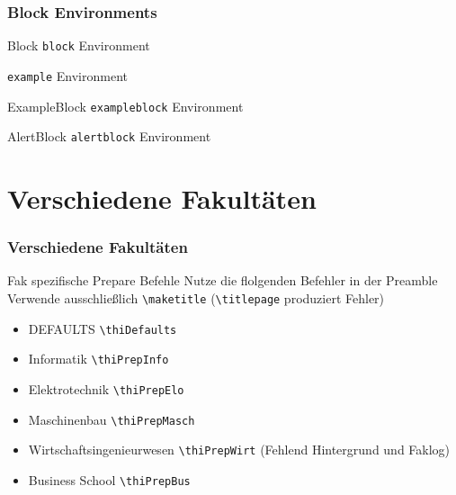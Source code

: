 \documentclass[aspectratio=169]{beamer}
\begin{document}
\begin{frame}
    \frametitle{Block Environments}
    \begin{block}{Block}
        \texttt{block} Environment
    \end{block}
    \begin{example}
        \texttt{example} Environment
    \end{example}
    \begin{exampleblock}{ExampleBlock}
        \texttt{exampleblock} Environment
    \end{exampleblock}
    \begin{alertblock}{AlertBlock}
        \texttt{alertblock} Environment
    \end{alertblock}
\end{frame}

\section{Verschiedene Fakultäten}
\begin{frame}
    \frametitle{Verschiedene Fakultäten}
    \begin{alertblock}{Fak spezifische Prepare Befehle}
        Nutze die flolgenden Befehler in der Preamble\\
        Verwende ausschließlich \texttt{\textbackslash maketitle} (\texttt{\textbackslash titlepage} produziert Fehler)
    \end{alertblock}
    \begin{itemize}
        \item \textcolor{thiblue}{DEFAULTS} \texttt \texttt{\textbackslash thiDefaults}
        \item \textcolor{\thifakinfocolor}{Informatik} \texttt{\textbackslash thiPrepInfo}
        \item \textcolor{\thifakelocolor}{Elektrotechnik} \texttt{\textbackslash thiPrepElo}
        \item \textcolor{\thifakmaschcolor}{Maschinenbau} \texttt{\textbackslash thiPrepMasch}
        \item \textcolor{\thifakwirtcolor}{Wirtschaftsingenieurwesen} \texttt{\textbackslash thiPrepWirt} (Fehlend Hintergrund und Faklog)
        \item \textcolor{\thifakbuscolor}{Business School} \texttt{\textbackslash thiPrepBus}
    \end{itemize}
\end{frame}

\thiDefaults
\thiPrepInfo
\subsection{\thifak}
\def \thititleB {\thifak}
\maketitle
\end{document}
